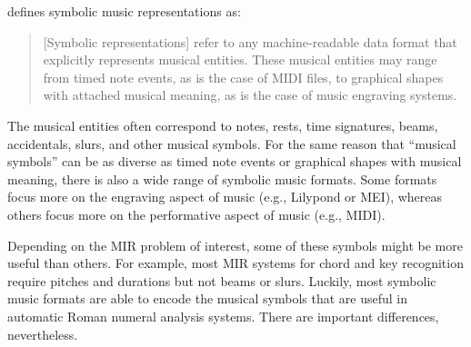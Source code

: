 

\textcite{muller2015music} defines symbolic music
representations as:

\begin{quote}
[Symbolic representations] refer to any machine-readable
data format that explicitly represents musical entities.
These musical entities may range from timed note events, as
is the case of MIDI ﬁles, to graphical shapes with attached
musical meaning, as is the case of music engraving systems.
\end{quote}


The musical entities often correspond to notes, rests, time
signatures, beams, accidentals, slurs, and other musical
symbols. For the same reason that ``musical symbols'' can be
as diverse as timed note events or graphical shapes with
musical meaning, there is also a wide range of symbolic
music formats. Some formats focus more on the engraving
aspect of music (e.g., Lilypond or MEI), whereas others
focus more on the performative aspect of music (e.g., MIDI).

Depending on the MIR problem of interest, some of these
symbols might be more useful than others. For example, most
MIR systems for chord and key recognition require pitches
and durations but not beams or slurs. Luckily, most symbolic
music formats are able to encode the musical symbols that
are useful in automatic Roman numeral analysis systems.
There are important differences, nevertheless.
